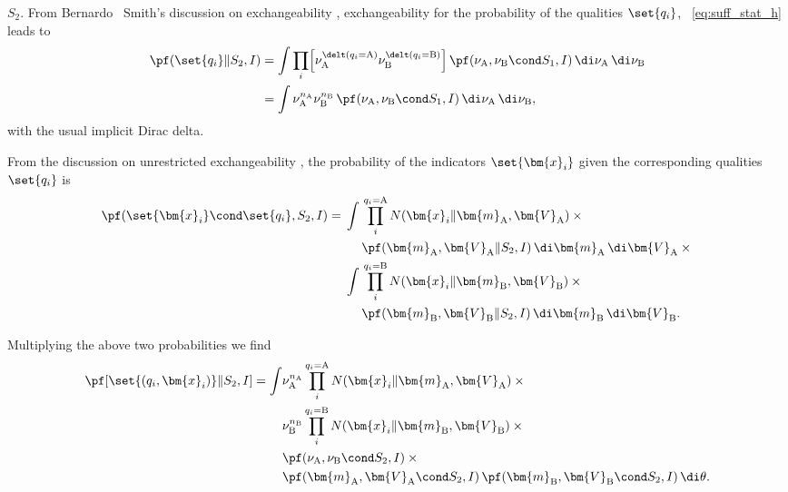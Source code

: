 \documentclass[10pt,%
onecolumn,oneside,a5paper,article,frenchb,italian,german,swedish,latin,british%
]{memoir}
\newcommand*{\yI}{I}
\newcommand*{\yS}{S}
\newcommand*{\yh}{q}
\newcommand*{\bx}{\bm{x}}
\newcommand*{\ya}{\textrm{A}}
\newcommand*{\yb}{\textrm{B}}
\newcommand*{\yna}{n_{\ya}}
\newcommand*{\ynb}{n_{\yb}}
\newcommand*{\yfa}{\nu_{\ya}}
\newcommand*{\yfb}{\nu_{\yb}}
\newcommand*{\yca}{\bm{m}_{\ya}}
\newcommand*{\ycb}{\bm{m}_{\yb}}
\newcommand*{\yssa}{\bm{V}_{\ya}}
\newcommand*{\yssb}{\bm{V}_{\yb}}
\newcommand*{\yth}{\theta}
\newcommand*{\yN}{N}
\begin{document}
\bigskip

$\yS_2$. From Bernardo \amp\ Smith's discussion on exchangeability
\cite[\sect~4.3]{bernardoetal1994_r2000}, exchangeability for the
probability of the qualities $\set{\yh_i}$, \eqn~\eqref{eq:suff_stat_h}
leads to
\begin{equation}
  \label{eq:P_integral_S2_h}
  \begin{split}
    \pf(\set{\yh_i} \| \yS_2, \yI) &= \int \prod_i\Bigl[\yfa^{\delt(\yh_i=\ya)}
    \yfb^{\delt(\yh_i=\yb)}\Bigr] \,\pf(\yfa,\yfb\cond \yS_1,\yI)
    \,\di\yfa\,\di\yfb\\
    &=\int\yfa^{\yna} \yfb^{\ynb}\,\pf(\yfa,\yfb\cond \yS_1,\yI)
    \,\di\yfa\,\di\yfb,
  \end{split}
\end{equation}
with the usual implicit Dirac delta.

From the discussion on unrestricted exchangeability
\cite[\sect~4.6.2]{bernardoetal1994_r2000}, the probability of the
indicators $\set{\bx_i}$ given the corresponding qualities $\set{\yh_i}$ is
\begin{equation}
  \label{eq:P_integral_S2_x}
  \!\begin{aligned}
    \pf(\set{\bx_i} \cond \set{\yh_i}, \yS_2, \yI) = {}&\int
    \!\begin{aligned}[t]
    &\prod_i^{\yh_i=\ya}\yN(\bx_i \| \yca,\yssa)\times{}\\
    &\pf(\yca,\yssa \| \yS_2,\yI)\,\di\yca\,\di\yssa\times{}
  \end{aligned}\\
&\int\!\begin{aligned}[t]
    &\prod_i^{\yh_i=\yb}\yN(\bx_i \| \ycb,\yssb)\times{}\\
    &\pf(\ycb,\yssb \| \yS_2,\yI)\,\di\ycb\,\di\yssb.
  \end{aligned}
  \end{aligned}
\end{equation}

Multiplying the above two probabilities we find
\begin{equation}
  \label{eq:P_integral_exp_S2_final}
  \!\begin{aligned}
    \pf[\set{(\yh_i,\bx_i)} \| \yS_2, \yI]=\int
    &\yfa^{\yna} \prod_i^{\yh_i=\ya}\yN(\bx_i \| \yca,\yssa)\times{}\\
    &\yfb^{\ynb} \prod_i^{\yh_i=\yb}\yN(\bx_i \| \ycb,\yssb)\times{}\\
    &\pf(\yfa,\yfb\cond \yS_2,\yI)\times{}\\
    &\pf(\yca,\yssa\cond \yS_2,\yI)\, 
    \pf(\ycb,\yssb\cond \yS_2,\yI)\, \di\yth.
  \end{aligned}
\end{equation}
\end{document}
